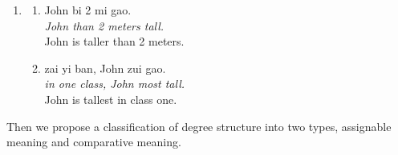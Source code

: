 \documentclass{ctexart}
\begin{document}
\begin{enumerate}
    \item
    \begin{enumerate}
        \item \label{specific_value_comparison_example}
        John bi 2 mi gao.\\
        \textit{John than 2 meters tall.} \\
        John is taller than 2 meters.

        \item \label{individual_set_comparison_example}
        zai yi ban, John zui gao.\\
        \textit{in one class, John most tall.}\\
        John is tallest in class one.

    \end{enumerate}
\end{enumerate}

\noindent
Then we propose a classification of degree structure into two types, assignable meaning and comparative meaning.
\end{document}
